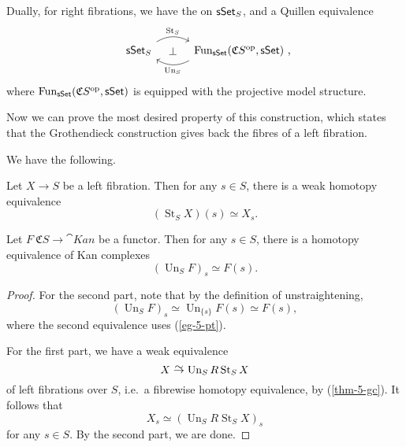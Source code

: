 \begin{remark}
    Dually, for right fibrations, we have the 
    on $\textup{\textsf{sSet}}_{\/S}$, and a Quillen equivalence
    \[\begin{tikzcd}[column sep=3em]
        \cat{sSet}_{\/S}\ar[r,bend left,start anchor=north east,end anchor=north west,"\operatorname{St}_S"]
        \ar[r,phantom,"\bot"] &
        \operatorname{Fun}_{\cat{sSet}}(\mathfrak CS\op,\cat{sSet})\rlap{\ ,}
        \ar[l,bend left,start anchor=south west,end anchor=south east,"\operatorname{Un}_S"]
    \end{tikzcd}\]
    where $\operatorname{Fun}_{\textup{\textsf{sSet}}}(\mathfrak CS^{\mathrm{op}},\textup{\textsf{sSet}})$
    is equipped with the projective model structure. \varqed
\end{remark}

Now we can prove the most desired property of this construction,
which states that the Grothendieck construction 
gives back the fibres of a left fibration.

\begin{proposition}\label{thm-5-s}
    We have the following.
    \begin{itms}
        \item Let $X\to S$ be a left fibration.
        Then for any $s\in S$, there is a weak homotopy equivalence
        \[ (\operatorname{St}_SX)(s)\simeq X_s. \]
        \item Let $F\:\mathfrak CS\to\cat{Kan}$ be a functor.
        Then for any $s\in S$, there is a homotopy equivalence of Kan complexes
        \[ (\operatorname{Un}_SF)_s\simeq F(s). \]
    \end{itms}
\end{proposition}

\begin{proof}
    For the second part, note that by the definition of unstraightening,
    \[ (\operatorname{Un}_SF)_s \simeq \operatorname{Un}_{\{s\}}F(s) \simeq F(s), \]
    where the second equivalence uses (\ref{eg-5-pt}).

    For the first part, we have a weak equivalence
    \[ X \simto \operatorname{Un}_S R \operatorname{St}_S X \]
    of left fibrations over $S$,
    i.e.\ a fibrewise homotopy equivalence, by (\ref{thm-5-gc}).
    It follows that
    \[ X_s \simeq (\operatorname{Un}_SR\operatorname{St}_SX)_s \]
    for any $s\in S$. By the second part, we are done.
\end{proof}

